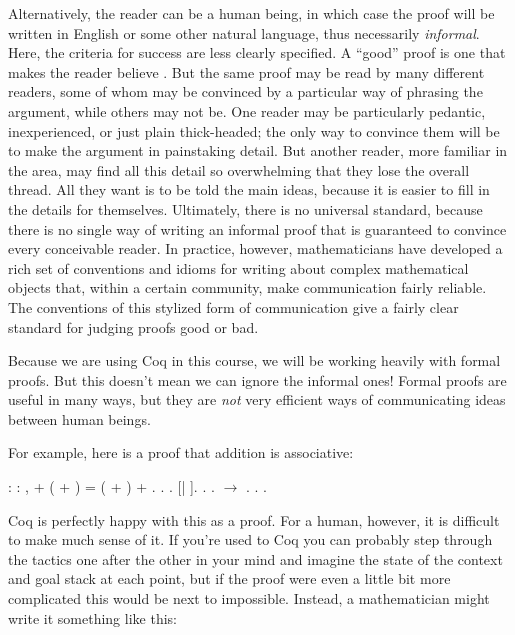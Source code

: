 \documentclass[12pt]{report}
\begin{document}
    Alternatively, the reader can be a human being, in which case the
    proof will be written in English or some other natural language,
    thus necessarily \textit{informal}.  Here, the criteria for success are
    less clearly specified.  A ``good'' proof is one that makes the
    reader believe .  But the same proof may be read by many
    different readers, some of whom may be convinced by a particular
    way of phrasing the argument, while others may not be.  One reader
    may be particularly pedantic, inexperienced, or just plain
    thick-headed; the only way to convince them will be to make the
    argument in painstaking detail.  But another reader, more familiar
    in the area, may find all this detail so overwhelming that they
    lose the overall thread.  All they want is to be told the main
    ideas, because it is easier to fill in the details for themselves.
    Ultimately, there is no universal standard, because there is no
    single way of writing an informal proof that is guaranteed to
    convince every conceivable reader.  In practice, however,
    mathematicians have developed a rich set of conventions and idioms
    for writing about complex mathematical objects that, within a
    certain community, make communication fairly reliable.  The
    conventions of this stylized form of communication give a fairly
    clear standard for judging proofs good or bad.


    Because we are using Coq in this course, we will be working
    heavily with formal proofs.  But this doesn't mean we can ignore
    the informal ones!  Formal proofs are useful in many ways, but
    they are \textit{not} very efficient ways of communicating ideas between
    human beings. 

 For example, here is a proof that addition is associative: \begin{coqdoccode}
\coqdocemptyline
\coqdocnoindent
{}  : \coqdockw{\ensuremath{\forall}}    : ,\coqdoceol
\coqdocindent{1.00em}
 + ( + ) = ( + ) + .\coqdoceol
\coqdocnoindent
{}.    .    [| ]. .\coqdoceol
\coqdocindent{1.00em}
.  \ensuremath{\rightarrow} . . .\coqdoceol
\coqdocemptyline
\end{coqdoccode}
Coq is perfectly happy with this as a proof.  For a human,
    however, it is difficult to make much sense of it.  If you're used
    to Coq you can probably step through the tactics one after the
    other in your mind and imagine the state of the context and goal
    stack at each point, but if the proof were even a little bit more
    complicated this would be next to impossible.  Instead, a
    mathematician might write it something like this: 
\end{document}

